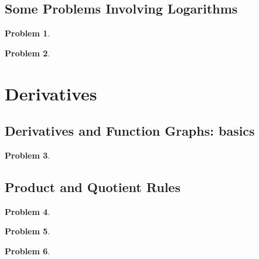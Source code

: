 \documentclass{article}
\newtheorem{problem}{Problem}
\begin{document}
\subsection{Some Problems Involving Logarithms}
\begin{problem}

\end{problem}

\begin{problem}

\end{problem}





\section{Derivatives}
\subsection{Derivatives and Function Graphs: basics}\label{secMPSderivativesFunGraphsBasics}
\begin{problem}

\end{problem}
\subsection{Product and Quotient Rules}\label{secMPSproductQuotientRules}

\begin{problem}

\end{problem}


\begin{problem}

\end{problem}


\begin{problem}

\end{problem}

\end{document}
